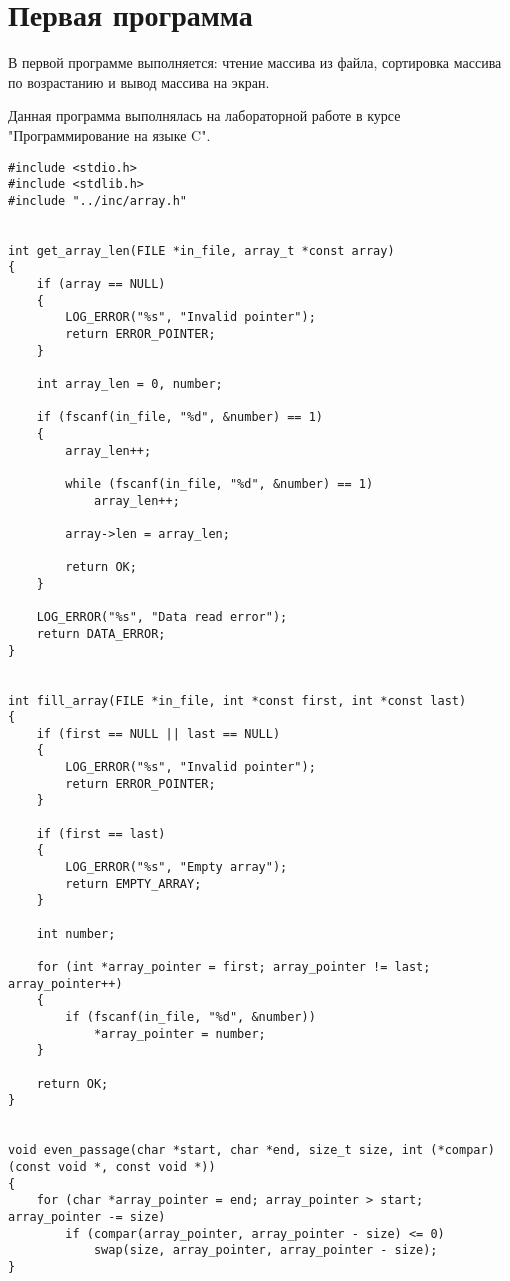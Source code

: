 \section*{Первая программа}

В первой программе выполняется: чтение массива из файла, сортировка массива по возрастанию и вывод массива на экран.

Данная программа выполнялась на лабораторной работе в курсе "Программирование на языке C".

\begin{center}
    \captionsetup{justification=raggedright,singlelinecheck=off}
    \begin{lstlisting}[label=lst:array,caption=array.c]
#include <stdio.h>
#include <stdlib.h>
#include "../inc/array.h"


int get_array_len(FILE *in_file, array_t *const array)
{
    if (array == NULL)
    {
        LOG_ERROR("%s", "Invalid pointer");
        return ERROR_POINTER;
    }

    int array_len = 0, number;

    if (fscanf(in_file, "%d", &number) == 1)
    {
        array_len++;

        while (fscanf(in_file, "%d", &number) == 1)
            array_len++;

        array->len = array_len;

        return OK;
    }

    LOG_ERROR("%s", "Data read error");
    return DATA_ERROR;
}


int fill_array(FILE *in_file, int *const first, int *const last)
{
    if (first == NULL || last == NULL)
    {
        LOG_ERROR("%s", "Invalid pointer");
        return ERROR_POINTER;
    }

    if (first == last)
    {
        LOG_ERROR("%s", "Empty array");
        return EMPTY_ARRAY;
    }

    int number;

    for (int *array_pointer = first; array_pointer != last; array_pointer++)
    {
        if (fscanf(in_file, "%d", &number))
            *array_pointer = number;
    }

    return OK;
}


void even_passage(char *start, char *end, size_t size, int (*compar)(const void *, const void *))
{
    for (char *array_pointer = end; array_pointer > start; array_pointer -= size)
        if (compar(array_pointer, array_pointer - size) <= 0)
            swap(size, array_pointer, array_pointer - size);
}



\end{lstlisting}
\end{center}
